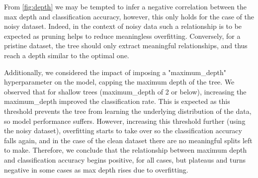 \documentclass[11pt,twoside]{article}
\begin{document}
%
From \autoref{fig:depth} we may be tempted to infer a negative correlation between the max depth and classification accuracy, however, this only holds for the case of the noisy dataset. Indeed, in the context of noisy data such a relationship is to be expected as pruning helps to reduce meaningless overfitting. Conversely, for a pristine dataset, the tree should only extract meaningful relationships, and thus reach a depth similar to the optimal one.

Additionally, we considered the impact of imposing a "maximum\_depth" hyperparameter on the model, capping the maximum depth of the tree. We observed that for shallow trees (maximum\_depth of 2 or below), increasing the maximum\_depth improved the classification rate. This is expected as this threshold prevents the tree from learning the underlying distribution of the data, so model performance suffers. However, increasing this threshold further (using the noisy dataset), overfitting starts to take over so the classification accuracy falls again, and in the case of the clean dataset there are no meaningful splits left to make. Therefore, we conclude that the relationship between maximum depth and classification accuracy begins positive, for all cases, but plateaus and turns negative in some cases as max depth rises due to overfitting.






\newpage
\begin{appendices}

\newpage






\end{appendices}
\end{document}
